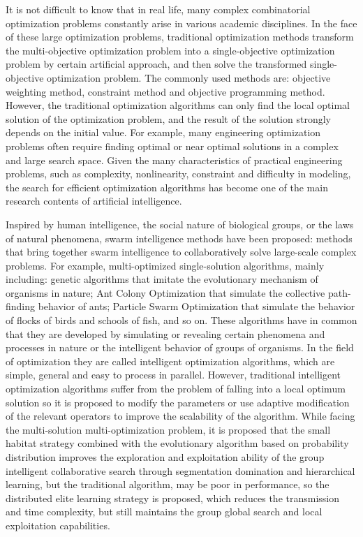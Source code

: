 \documentclass[twocolumn]{article}
\begin{document}
It is not difficult to know that in real life, many complex
combinatorial optimization problems constantly arise in various academic
disciplines. In the face of these large optimization problems,
traditional optimization methods transform the multi-objective
optimization problem into a single-objective optimization problem by
certain artificial approach, and then solve the transformed
single-objective optimization problem. The commonly used methods are:
objective weighting method, constraint method and objective programming
method. However, the traditional optimization algorithms can only find
the local optimal solution of the optimization problem, and the result
of the solution strongly depends on the initial value. For example, many
engineering optimization problems often require finding optimal or near
optimal solutions in a complex and large search space. Given the many
characteristics of practical engineering problems, such as complexity,
nonlinearity, constraint and difficulty in modeling, the search for
efficient optimization algorithms has become one of the main research
contents of artificial intelligence.

Inspired by human intelligence, the social nature of biological groups,
or the laws of natural phenomena, swarm intelligence methods have been
proposed: methods that bring together swarm intelligence to
collaboratively solve large-scale complex problems. For example,
multi-optimized single-solution algorithms, mainly including: genetic
algorithms that imitate the evolutionary mechanism of organisms in
nature; Ant Colony Optimization that simulate the collective
path-finding behavior of ants; Particle Swarm Optimization that simulate
the behavior of flocks of birds and schools of fish, and so on. These
algorithms have in common that they are developed by simulating or
revealing certain phenomena and processes in nature or the intelligent
behavior of groups of organisms. In the field of optimization they are
called intelligent optimization algorithms, which are simple, general
and easy to process in parallel. However, traditional intelligent
optimization algorithms suffer from the problem of falling into a local
optimum solution so it is proposed to modify the parameters or use
adaptive modification of the relevant operators to improve the
scalability of the algorithm. While facing the multi-solution
multi-optimization problem, it is proposed that the small habitat
strategy combined with the evolutionary algorithm based on probability
distribution improves the exploration and exploitation ability of the
group intelligent collaborative search through segmentation domination
and hierarchical learning, but the traditional algorithm, may be poor in
performance, so the distributed elite learning strategy is proposed,
which reduces the transmission and time complexity, but still maintains
the group global search and local exploitation capabilities.
\end{document}
